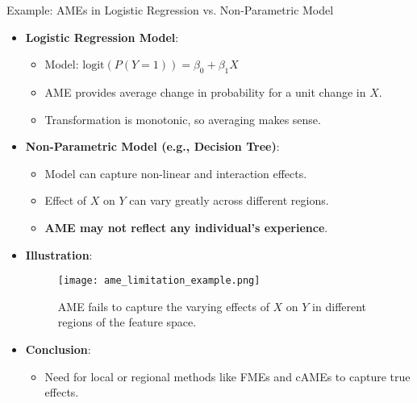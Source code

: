 \documentclass[11pt,compress,t,notes=noshow, aspectratio=169, xcolor=table]{beamer}
\begin{document}
\begin{frame}{Example: AMEs in Logistic Regression vs. Non-Parametric Model}
\begin{itemize}
\item \textbf{Logistic Regression Model}:
\begin{itemize}
\item Model: $\text{logit}(P(Y=1)) = \beta_0 + \beta_1 X$
\item AME provides average change in probability for a unit change in $X$.
\item Transformation is monotonic, so averaging makes sense.
\end{itemize}
\item \textbf{Non-Parametric Model (e.g., Decision Tree)}:
\begin{itemize}
\item Model can capture non-linear and interaction effects.
\item Effect of $X$ on $Y$ can vary greatly across different regions.
\item \textbf{AME may not reflect any individual's experience}.
\end{itemize}
\item \textbf{Illustration}:
\begin{figure}
\centering
\texttt{[image: ame\_limitation\_example.png]}
\caption{AME fails to capture the varying effects of $X$ on $Y$ in different regions of the feature space.}
\end{figure}
\item \textbf{Conclusion}:
\begin{itemize}
\item Need for local or regional methods like FMEs and cAMEs to capture true effects.
\end{itemize}
\end{itemize}
\end{frame}
\end{document}
